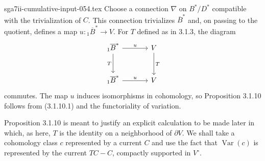 \begin{filecontents*}{sga7ii-cumulative-input-054.tex}
Choose a connection $\nabla$ on $B^*/D^*$ compatible with the
trivialization of $C$.  This connection trivializes $\overline B^*$
and, on passing to the quotient, defines a map
$u:{}_1\overline B^*\to V$.  For $T$ defined as in 3.1.3, the diagram
\[
\begin{tikzcd}[column sep=large,row sep=large]
{}_1\overline B^* \arrow[r,"u"] \arrow[d,"T"']
  & V \arrow[d,"T"] \\
{}_1\overline B^* \arrow[r,"u"]
  & V
\end{tikzcd}
\]
commutes.  The map $u$ induces isomorphisms in cohomology, so
Proposition 3.1.10 follows from (3.1.10.1) and the functoriality of
variation.

Proposition 3.1.10 is meant to justify an explicit calculation to be
made later in which, as here, $T$ is the identity on a neighborhood
of $\partial V$.  We shall take a cohomology class $c$ represented by
a current $C$ and use the fact that $\operatorname{Var}(c)$ is
represented by the current $TC-C$, compactly supported in $V^\circ$.

\end{filecontents*}

